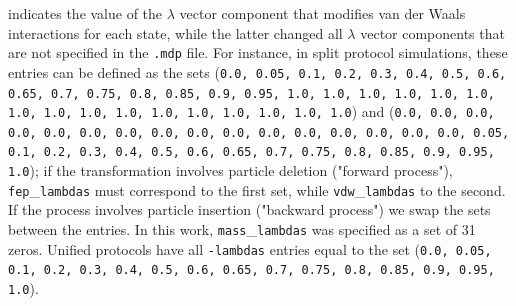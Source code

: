 \documentclass[journal=jctcce,manuscript=article]{achemso}
\newcommand{\inpopt}[1]{\texttt{#1}}
\begin{document}
indicates the value of the $\lambda$ vector component that modifies van der Waals interactions for each state,
while the latter changed all $\lambda$ vector components that are not specified in the \inpopt{.mdp} file.
For instance, in split protocol simulations, these entries can be defined as the sets 
(\inpopt{0.0, 0.05, 0.1, 0.2, 0.3, 0.4, 0.5, 0.6, 0.65, 0.7, 0.75, 0.8, 0.85, 0.9, 0.95, 1.0, 1.0, 1.0, 1.0, 1.0, 1.0, 
1.0, 1.0, 1.0,  1.0, 1.0,  1.0, 1.0, 1.0, 1.0, 1.0}) and (\inpopt{0.0, 0.0, 0.0, 0.0, 0.0, 0.0, 0.0, 0.0, 0.0, 0.0, 0.0, 
0.0, 0.0, 0.0, 0.0, 0.0, 0.05, 0.1, 0.2, 0.3, 0.4, 0.5, 0.6, 0.65, 0.7, 0.75, 
0.8, 0.85, 0.9, 0.95, 1.0}); if the 
transformation involves particle deletion ("forward process"), \inpopt{fep}\_\inpopt{lambdas} must correspond to 
the first set, while \inpopt{vdw}\_\inpopt{lambdas} to the second. If the process involves particle insertion ("backward 
process") we swap the sets between the entries. In this work, \inpopt{mass}\_\inpopt{lambdas} was specified as
a set of 31 zeros. Unified protocols have all \inpopt{-lambdas} entries equal to the set (\inpopt{0.0, 0.05, 
0.1, 0.2, 0.3, 0.4, 0.5, 0.6, 0.65, 0.7, 0.75, 0.8, 0.85, 0.9, 0.95, 1.0}).



\end{document}
